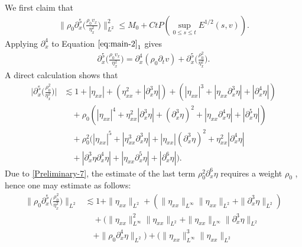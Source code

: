 \documentclass[11pt, reqno]{amsart}
\numberwithin{equation}{section}
\begin{document}
{\bigskip
{}
We first claim that
\begin{equation}\label{II-Priori-ellip-19}
\begin{aligned}
\bigg\|\rho_0\partial_x^5\bigg({\frac{\rho_0v_x}{\eta_x^2}}\bigg)\bigg\|_{L^2}^2\leq M_0+Ct P(\sup_{0\leq s\leq t}E^{1/2}(s,v)).
\end{aligned}
\end{equation}
Applying \(\partial_x^4\) to Equation \(\eqref{eq:main-2}_1\) gives
\begin{equation}\label{II-Priori-ellip-19.5}
\begin{aligned}
\partial_x^5\bigg(\frac{\rho_0v_x}{\eta_x^2}\bigg)=\partial_x^4(\rho_0\partial_tv)
+\partial_x^5\bigg(\frac{\rho_0^2}{\eta_x^2}\bigg).
\end{aligned}
\end{equation}
A direct calculation shows that
\begin{equation*}
\begin{aligned}
\bigg|\partial_x^5\bigg({\frac{\rho_0^2}{\eta_x^2}}\bigg)\bigg|
&\lesssim 1+|\eta_{xx}|+(\eta_{xx}^2+|\partial_x^3\eta|)
+(|\eta_{xx}|^3+|\eta_{xx}\partial_x^3\eta|+|\partial_x^4\eta|)\\
&\quad+\rho_0(|\eta_{xx}|^4+\eta_{xx}^2|\partial_x^3\eta|+(\partial_x^3\eta)^2+|\eta_{xx}\partial_x^4\eta|+|\partial_x^5\eta|)\\
&\quad+\rho_0^2(|\eta_{xx}|^5+|\eta_{xx}^3\partial_x^3\eta|+|\eta_{xx}|(\partial_x^3\eta)^2+\eta_{xx}^2|\partial_x^4\eta|\\
&\quad+|\partial_x^3\eta\partial_x^4\eta|+|\eta_{xx}\partial_x^5\eta|+|\partial_x^6\eta|).
\end{aligned}
\end{equation*}
Due to \eqref{Preliminary-7}, the estimate of the last term \(\rho_0^2\partial_x^6\eta\) requires a weight \(\rho_0\) ,
hence one may estimate as follows:
\begin{equation}\label{II-Priori-ellip-20}
\begin{aligned}
\bigg\|\rho_0\partial_x^5\bigg({\frac{\rho_0^2}{\eta_x^2}}\bigg)\bigg\|_{L^2}
&\lesssim 1+\|\eta_{xx}\|_{L^2}+(\|\eta_{xx}\|_{L^\infty}\|\eta_{xx}\|_{L^2}+\|\partial_x^3\eta\|_{L^2})\\
&\quad+(\|\eta_{xx}\|_{L^\infty}^2\|\eta_{xx}\|_{L^2}
+\|\eta_{xx}\|_{L^\infty}\|\partial_x^3\eta\|_{L^2}\\
&\quad+\|\rho_0\partial_x^4\eta\|_{L^2})
+(\|\eta_{xx}\|_{L^\infty}^3\|\eta_{xx}\|_{L^2}\\

\end{aligned}
\end{equation}}
\end{document}
